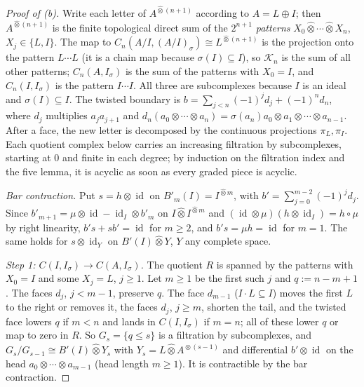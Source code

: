 \documentclass[11pt]{amsart}
\theoremstyle{definition}
\theoremstyle{remark}
\newcommand{\id}{\operatorname{id}}
\begin{document}
\begin{proof}[Proof of (b)]
Write each letter of $A^{\widehat\otimes(n+1)}$ according to $A=L\oplus I$;
then $A^{\widehat\otimes(n+1)}$ is the finite topological direct sum of the
$2^{n+1}$ \emph{patterns} $X_0\widehat\otimes\cdots\widehat\otimes X_n$,
$X_j\in\{L,I\}$.  The map to $C_n(A/I,(A/I)_\sigma)\cong L^{\widehat\otimes(n+1)}$
is the projection onto the pattern $L\cdots L$ (it is a chain map because
$\sigma(I)\subseteq I$), so $\mathcal K_n$ is the sum of all other patterns;
$C_n(A,I_\sigma)$ is the sum of the patterns with $X_0=I$, and $C_n(I,I_\sigma)$
is the pattern $I\cdots I$.  All three are subcomplexes because $I$ is an
ideal and $\sigma(I)\subseteq I$.  The twisted boundary is
$b=\sum_{j<n}(-1)^jd_j+(-1)^nd_n$, where $d_j$ multiplies $a_ja_{j+1}$ and
$d_n(a_0\otimes\cdots\otimes a_n)=\sigma(a_n)a_0\otimes a_1\otimes\cdots\otimes
a_{n-1}$.  After a face, the new letter is decomposed by the continuous
projections $\pi_L,\pi_I$.  Each quotient complex below carries an increasing
filtration by subcomplexes, starting at $0$ and finite in each degree; by
induction on the filtration index and the five lemma, it is acyclic as soon as
every graded piece is acyclic.

\emph{Bar contraction.}  Put $s=h\otimes\id$ on
$B'_m(I)=I^{\widehat\otimes m}$, with
$b'=\sum_{j=0}^{m-2}(-1)^jd_j$.  Since $b'_{m+1}=\mu\otimes\id-\id_I\otimes b'_m$
on $I\widehat\otimes I^{\widehat\otimes m}$ and
$(\id\otimes\mu)(h\otimes\id_I)=h\circ\mu$ by right linearity, $b's+sb'=\id$ for
$m\ge2$, and $b's=\mu h=\id$ for $m=1$.  The same holds for $s\otimes\id_Y$ on
$B'(I)\widehat\otimes Y$, $Y$ any complete space.

\emph{Step 1: $C(I,I_\sigma)\to C(A,I_\sigma)$.}  The quotient $R$ is spanned by
the patterns with $X_0=I$ and some $X_j=L$, $j\ge1$.  Let $m\ge1$ be the first
such $j$ and $q:=n-m+1$.  The faces $d_j$, $j<m-1$, preserve $q$.  The face
$d_{m-1}$ ($I\cdot L\subseteq I$) moves the first $L$ to the right or removes
it, the faces $d_j$, $j\ge m$, shorten the tail, and the twisted face lowers $q$
if $m<n$ and lands in $C(I,I_\sigma)$ if $m=n$; all of these lower $q$ or map
to zero in $R$.  So $G_s=\{q\le s\}$ is a filtration by subcomplexes, and
$G_s/G_{s-1}\cong B'(I)\widehat\otimes Y_s$ with
$Y_s=L\widehat\otimes A^{\widehat\otimes(s-1)}$ and differential $b'\otimes\id$
on the head $a_0\otimes\cdots\otimes a_{m-1}$ (head length $m\ge1$).  It is
contractible by the bar contraction.


\end{proof}
\end{document}
